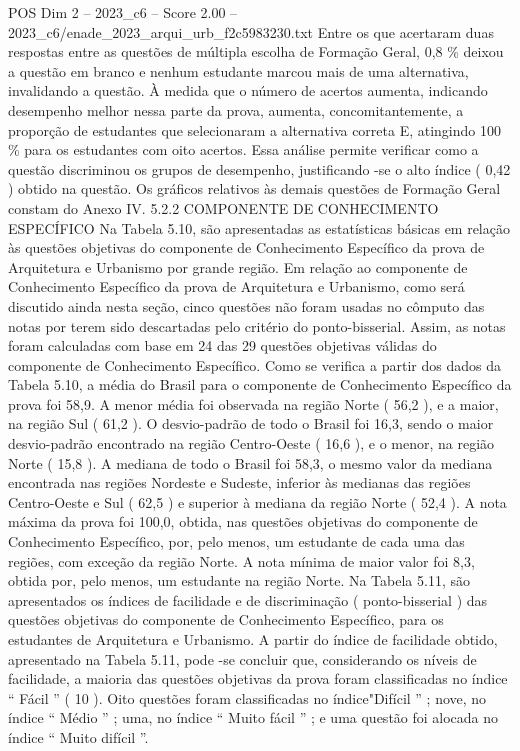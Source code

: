 \begin{textsample}{POS Dim 2 – 2023\_c6 – Score 2.00 – 2023\_c6/enade\_2023\_arqui\_urb\_f2c5983230.txt}
Entre os que acertaram duas respostas entre as questões de múltipla escolha de Formação Geral, 0,8 \% deixou a questão em branco e nenhum estudante marcou mais de uma alternativa, invalidando a questão.
À medida que o número de acertos aumenta, indicando desempenho melhor nessa parte da prova, aumenta, concomitantemente, a proporção de estudantes que selecionaram a alternativa correta E, atingindo 100 \% para os estudantes com oito acertos.
Essa análise permite verificar como a questão discriminou os grupos de desempenho, justificando -se o alto índice ( 0,42 ) obtido na questão.
Os gráficos relativos às demais questões de Formação Geral constam do Anexo IV. 5.2.2 COMPONENTE DE CONHECIMENTO ESPECÍFICO Na Tabela 5.10, são apresentadas as estatísticas básicas em relação às questões objetivas do componente de Conhecimento Específico da prova de Arquitetura e Urbanismo por grande região.
Em relação ao componente de Conhecimento Específico da prova de Arquitetura e Urbanismo, como será discutido ainda nesta seção, cinco questões não foram usadas no cômputo das notas por terem sido descartadas pelo critério do ponto-bisserial.
Assim, as notas foram calculadas com base em 24 das 29 questões objetivas válidas do componente de Conhecimento Específico.
Como se verifica a partir dos dados da Tabela 5.10, a média do Brasil para o componente de Conhecimento Específico da prova foi 58,9.
A menor média foi observada na região Norte ( 56,2 ), e a maior, na região Sul ( 61,2 ).
O desvio-padrão de todo o Brasil foi 16,3, sendo o maior desvio-padrão encontrado na região Centro-Oeste ( 16,6 ), e o menor, na região Norte ( 15,8 ).
A mediana de todo o Brasil foi 58,3, o mesmo valor da mediana encontrada nas regiões Nordeste e Sudeste, inferior às medianas das regiões Centro-Oeste e Sul ( 62,5 ) e superior à mediana da região Norte ( 52,4 ).
A nota máxima da prova foi 100,0, obtida, nas questões objetivas do componente de Conhecimento Específico, por, pelo menos, um estudante de cada uma das regiões, com exceção da região Norte.
A nota mínima de maior valor foi 8,3, obtida por, pelo menos, um estudante na região Norte.
Na Tabela 5.11, são apresentados os índices de facilidade e de discriminação ( ponto-bisserial ) das questões objetivas do componente de Conhecimento Específico, para os estudantes de Arquitetura e Urbanismo.
A partir do índice de facilidade obtido, apresentado na Tabela 5.11, pode -se concluir que, considerando os níveis de facilidade, a maioria das questões objetivas da prova foram classificadas no índice “ Fácil ” ( 10 ).
Oito questões foram classificadas no índice"Difícil ” ; nove, no índice “ Médio ” ; uma, no índice “ Muito fácil ” ; e uma questão foi alocada no índice “ Muito difícil ”.

\end{textsample}
